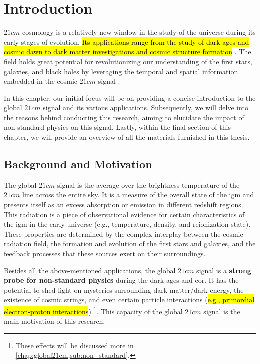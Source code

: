 \documentclass[12pt, TexShade, letterpaper]{report}
\begin{document}
 	\clearpage
	
	\glsresetall
\chapter{Introduction}
\label{chap:intro}
$21cm$ cosmology is a relatively new window in the study of the universe during its early stages of evolution. \hl{Its applications range from the study of dark ages and cosmic dawn to dark matter investigations and cosmic structure formation} \cite{SKA_dark_ages}. The field holds great potential for revolutionizing our understanding of the first stars, galaxies, and black holes by leveraging the temporal and spatial information embedded in the cosmic $21cm$ signal \cite{21cmfast_c}.\par

In this chapter, our initial focus will be on providing a concise introduction to the global $21cm$ signal and its various applications. Subsequently, we will delve into the reasons behind conducting this research, aiming to elucidate the impact of non-standard physics on this signal. Lastly, within the final section of this chapter, we will provide an overview of all the materials furnished in this thesis.\par
\section{Background and Motivation}
The global $21cm$ signal is the average over the brightness temperature of the $21cm$ line across the entire sky. It is a measure of the overall state of the \gls{igm} and presents itself as an excess absorption or emission in different redshift regions. This radiation is a piece of observational evidence for certain characteristics of the \gls{igm} in the early universe (e.g., temperature, density, and reionization state). These properties are determined by the complex interplay between the cosmic radiation field, the formation and evolution of the first stars and galaxies, and the feedback processes that these sources exert on their surroundings\cite{21century}.\par
Besides all the above-mentioned applications, the global $21cm$ signal is a \textbf{strong probe for non-standard physics} during the dark ages and \gls{eor}. It has the potential to shed light on mysteries surrounding dark matter/dark energy, the existence of cosmic strings, and even certain particle interactions (\hl{e.g., primordial electron-proton interactions}) \cite{dark_nature_21, constrain_dm_21, cosmic_string_brandenberger, ee_interaction_21, neutrino_21} \footnote{These effects will be discussed more in \ref{chap:global21cm,sub:non_standard}.}. This capacity of the global $21cm$ signal is the main motivation of this research.\par
\end{document}
